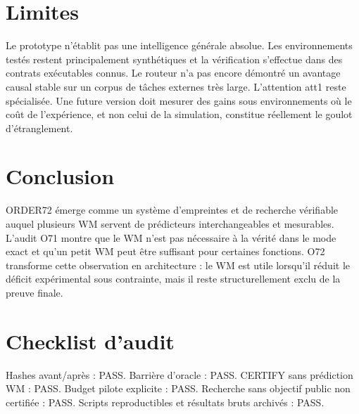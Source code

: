 \documentclass[11pt,a4paper]{article}
\begin{document}
\section{Limites}
Le prototype n'établit pas une intelligence générale absolue. Les environnements testés restent principalement synthétiques et la vérification s'effectue dans des contrats exécutables connus. Le routeur n'a pas encore démontré un avantage causal stable sur un corpus de tâches externes très large. L'attention att1 reste spécialisée. Une future version doit mesurer des gains sous environnements où le coût de l'expérience, et non celui de la simulation, constitue réellement le goulot d'étranglement.
\section{Conclusion}
ORDER72 émerge comme un système d'empreintes et de recherche vérifiable auquel plusieurs WM servent de prédicteurs interchangeables et mesurables. L'audit O71 montre que le WM n'est pas nécessaire à la vérité dans le mode exact et qu'un petit WM peut être suffisant pour certaines fonctions. O72 transforme cette observation en architecture : le WM est utile lorsqu'il réduit le déficit expérimental sous contrainte, mais il reste structurellement exclu de la preuve finale.
\appendix
\section{Checklist d'audit}
Hashes avant/après : PASS. Barrière d'oracle : PASS. CERTIFY sans prédiction WM : PASS. Budget pilote explicite : PASS. Recherche sans objectif public non certifiée : PASS. Scripts reproductibles et résultats bruts archivés : PASS.
\end{document}
